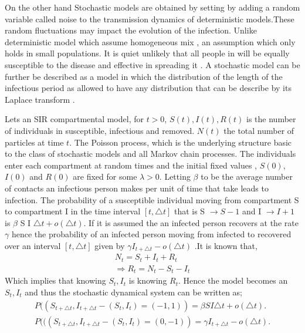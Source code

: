 On the other hand Stochastic models are obtained by setting by adding a random variable called noise to the transmission dynamics of deterministic models.These random fluctuations may impact the evolution of the infection. Unlike deterministic model which assume homogeneous mix , an assumption which only holds in small populations. It is quiet unlikely that all people in will be equally susceptible to the disease and effective in spreading it \citep{ball1985deterministic}. A stochastic model can be further be described as a model in which the distribution of the length of the infectious period as allowed to have any distribution that can be describe by its Laplace transform \citep{addy1991generalized}.
 
Lets an SIR compartmental model, for $t > 0$, $S(t),I(t),R(t)$ is the number of individuals in susceptible, infectious and removed. $N(t)$ the total number of particles at time $t$. The Poisson process, which is the underlying structure basic to the class of stochastic models and all Markov chain processes\citep{greenwood2009stochastic}.
The individuals enter each compartment at random times
and the initial fixed values , $S(0)$,$I(0)$ and $R(0)$ are fixed for some $\lambda > 0$.
Letting $\beta$ to be the average number of  contacts an infectious person makes per unit of time that take leads to infection. The probability of a susceptible individual moving from compartment S to compartment I in the time interval $\left[ t,\triangle t \right]$ that is  S $\rightarrow S-1$ and I $\rightarrow I + 1 $ is $ \beta$ S I $ \triangle t + o (\triangle t)$. If it is assumed the an infected person recovers at the rate $\gamma$ hence the probability of an infected person moving from infected to recovered over an interval $\left[ t,\triangle t \right]$  given by $\gamma I_{t + \triangle t} -o (\triangle t)$ .It is known that,
 \begin{align*}
 N_t = S_t + I_t + R_t
 \\ \Rightarrow  R_t = N_t - S_t - I_t
\end{align*}  
Which implies that knowing $S_t,I_t$ is knowing $R_t$. Hence the model becomes an $S_t,I_t$ and thus the stochastic dynamical system can be written as;
 \begin{align}
 P((S_{t + \triangle t}, I_{t + \triangle t} - (S_t ,I_t) = ( - 1,1)) =  \beta S I  \triangle t + o (\triangle t).
 \\ P (((S_{t + \triangle t}, I_{t + \triangle t} - (S_t ,I_t) = ( 0,-1)) = \gamma I_{t + \triangle t} -o (\triangle t).
 \end{align}
